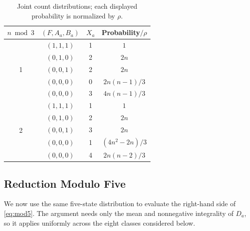 \documentclass[12pt,letterpaper,onecolumn]{article}
\theoremstyle{definition}
\begin{document}
\begin{table}[t]
\caption{Joint count distributions; each displayed probability is normalized by $\rho$.}
\label{tab:states}
\centering
\small
\setlength{\tabcolsep}{6pt}
\renewcommand{\arraystretch}{1.08}
\begin{tabular}{cccc}
\toprule
$n\bmod3$ & $(F,A_a,B_a)$ & $X_a$ & Probability$/\rho$\\
\midrule
\multirow{5}{*}{1}&$(1,1,1)$&1&$1$\\
&$(0,1,0)$&2&$2n$\\
&$(0,0,1)$&2&$2n$\\
&$(0,0,0)$&0&$2n(n-1)/3$\\
&$(0,0,0)$&3&$4n(n-1)/3$\\
\midrule
\multirow{5}{*}{2}&$(1,1,1)$&1&$1$\\
&$(0,1,0)$&2&$2n$\\
&$(0,0,1)$&3&$2n$\\
&$(0,0,0)$&1&$(4n^2-2n)/3$\\
&$(0,0,0)$&4&$2n(n-2)/3$\\
\bottomrule
\end{tabular}
\end{table}

\subsection{Reduction Modulo Five}
We now use the same five-state distribution to evaluate the right-hand side of \eqref{eq:mod5}. The argument needs only the mean and nonnegative integrality of $D_a$, so it applies uniformly across the eight classes considered below.
\end{document}
